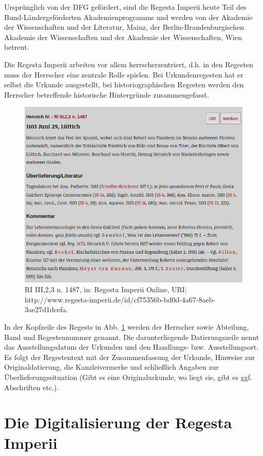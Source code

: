 \documentclass[ngerman,]{scrreprt}
\begin{document}
Ursprünglich von der DFG gefördert, sind die Regesta Imperii heute Teil des Bund-Ländergeförderten Akademienprogramms und werden von der Akademie der Wissenschaften und der Literatur, Mainz, der Berlin-Brandenburgischen Akademie der Wissenschaften und der Akademie der Wissenschaften, Wien betreut.

Die Regesta Imperii arbeiten vor allem herrscherzentriert, d.h. in den Regesten muss der Herrscher eine zentrale Rolle spielen. Bei Urkundenregesten hat er selbst die Urkunde ausgestellt, bei historiographischen Regesten werden den Herrscher betreffende historische Hintergründe zusammengefasst.

\begin{figure}
\centering
\includegraphics{Bilder/RI2Graph/ReggH4-Nr-1487.png}
\caption{RI III,2,3 n. 1487, in: Regesta Imperii Online, URI: http://www.regesta-imperii.de/id/cf75356b-bd0d-4a67-8aeb-3ae27d1dcefa.}
\label{regest}
\end{figure}

In der Kopfzeile des Regests in Abb. \ref{regest} werden der Herrscher sowie Abteilung, Band und Regestennummer genannt. Die darunterliegende Datierungszeile nennt das Ausstellungsdatum der Urkunden und den Handlungs- bzw. Ausstellungsort. Es folgt der Regestentext mit der Zusammenfassung der Urkunde, Hinweise zur Originaldatierung, die Kanzleivermerke und schließlich Angaben zur Überlieferungssituation (Gibt es eine Originalurkunde, wo liegt sie, gibt es ggf. Abschriften etc.).

\hypertarget{die-digitalisierung-der-regesta-imperii}{%
\section{Die Digitalisierung der Regesta Imperii}\label{die-digitalisierung-der-regesta-imperii}}
\end{document}
